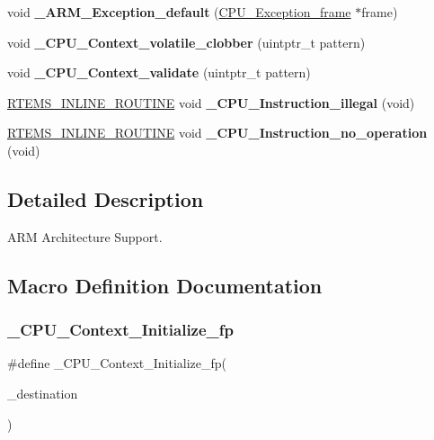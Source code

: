 \begin{DoxyCompactItemize}
void {\bfseries \+\_\+\+A\+R\+M\+\_\+\+Exception\+\_\+default} (\mbox{\hyperlink{structCPU__Exception__frame}{C\+P\+U\+\_\+\+Exception\+\_\+frame}} $\ast$frame)
\item 
\mbox{\label{group__RTEMSScoreCPUARM_gad26becade17fbdbb0bdf63c6b9228688}} 
void {\bfseries \+\_\+\+C\+P\+U\+\_\+\+Context\+\_\+volatile\+\_\+clobber} (uintptr\+\_\+t pattern)
\item 
\mbox{\label{group__RTEMSScoreCPUARM_ga3adb94b8d32fd0e3058934ffd3df6d90}} 
void {\bfseries \+\_\+\+C\+P\+U\+\_\+\+Context\+\_\+validate} (uintptr\+\_\+t pattern)
\item 
\mbox{\label{group__RTEMSScoreCPUARM_ga07618c93359f2485af2e98a96b330208}} 
\mbox{\hyperlink{group__RTEMSScoreBaseDefs_gac216239df231d5dbd15e3520b0b9313f}{R\+T\+E\+M\+S\+\_\+\+I\+N\+L\+I\+N\+E\+\_\+\+R\+O\+U\+T\+I\+NE}} void {\bfseries \+\_\+\+C\+P\+U\+\_\+\+Instruction\+\_\+illegal} (void)
\item 
\mbox{\label{group__RTEMSScoreCPUARM_gab683a0a37a089e2a0fd3c356836d5499}} 
\mbox{\hyperlink{group__RTEMSScoreBaseDefs_gac216239df231d5dbd15e3520b0b9313f}{R\+T\+E\+M\+S\+\_\+\+I\+N\+L\+I\+N\+E\+\_\+\+R\+O\+U\+T\+I\+NE}} void {\bfseries \+\_\+\+C\+P\+U\+\_\+\+Instruction\+\_\+no\+\_\+operation} (void)
\end{DoxyCompactItemize}


\subsection{Detailed Description}
A\+RM Architecture Support. 



\subsection{Macro Definition Documentation}
\mbox{\label{group__RTEMSScoreCPUARM_gac34a28abe9b31559d4096b2c942860a6}} 
\subsubsection{\texorpdfstring{\_CPU\_Context\_Initialize\_fp}{\_CPU\_Context\_Initialize\_fp}}
{\footnotesize\ttfamily \#define \+\_\+\+C\+P\+U\+\_\+\+Context\+\_\+\+Initialize\+\_\+fp(\begin{DoxyParamCaption}\item[{}]{\+\_\+destination }\end{DoxyParamCaption})}

